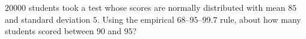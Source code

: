 $20000$ students took a test whose scores are normally distributed with mean $85$ and standard deviation $5$. Using the empirical $68$--$95$--$99.7$ rule, about how many students scored between $90$ and $95$?
